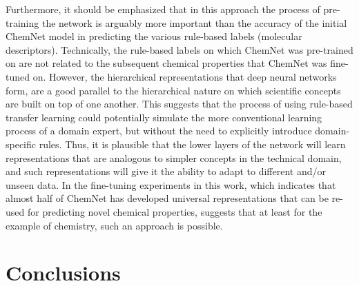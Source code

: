 \documentclass[sigconf]{acmart}
\begin{document}
Furthermore, it should be emphasized that in this approach the process of pre-training the network is arguably more important than the accuracy of the initial ChemNet model in predicting the various rule-based labels (molecular descriptors). Technically, the rule-based labels on which ChemNet was pre-trained on are not related to the subsequent chemical properties that ChemNet was fine-tuned on. However, the hierarchical representations that deep neural networks form, are a good parallel to the hierarchical nature on which scientific concepts are built on top of one another. This suggests that the process of using rule-based transfer learning could potentially simulate the more conventional learning process of a domain expert, but without the need to explicitly introduce domain-specific rules. Thus, it is plausible that the lower layers of the network will learn representations that are analogous to simpler concepts in the technical domain, and such representations will give it the ability to adapt to different and/or unseen data. In the fine-tuning experiments in this work, which indicates that almost half of ChemNet has developed universal representations that can be re-used for predicting novel chemical properties, suggests that at least for the example of chemistry, such an approach is possible.

\section{Conclusions}
\label{sec:conclusions}
\end{document}
